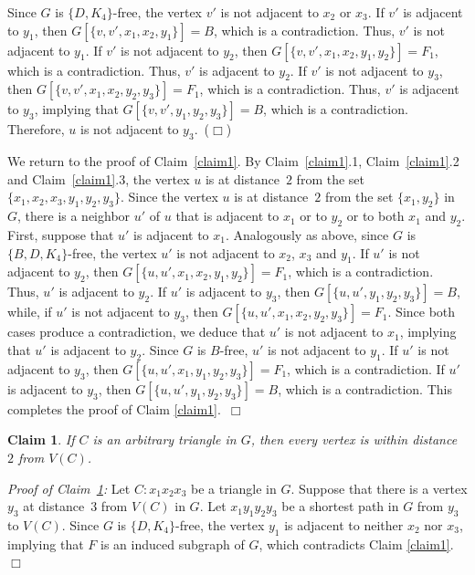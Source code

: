 \documentclass[12pt]{article}
\newtheorem{claim}{Claim}
\newcommand{\smallqed}{{\tiny ($\Box$)}}
\begin{document}
Since $G$ is $\{D,K_4\}$-free, the vertex $v'$ is not adjacent to $x_2$ or $x_3$.
If $v'$ is adjacent to $y_1$, then $G[\{v,v',x_1,x_2,y_1\}] = B$, which is a contradiction. Thus, $v'$ is not adjacent to $y_1$.
If $v'$ is not adjacent to $y_2$, then $G[\{v,v',x_1,x_2,y_1,y_2\}] = F_1$, which is a contradiction. Thus, $v'$ is adjacent to $y_2$.
If $v'$ is not adjacent to $y_3$, then $G[\{v, v', x_1, x_2, y_2,y_3\}]=F_1$, which is a contradiction. Thus, $v'$ is adjacent to $y_3$, implying that $G[\{v,v',y_1,y_2,y_3\}] = B$, which is a contradiction. Therefore, $u$ is not adjacent to $y_3$.~\smallqed

\medskip

\noindent We return to the proof of Claim~\ref{claim1}. By Claim~\ref{claim1}.1, Claim~\ref{claim1}.2 and Claim~\ref{claim1}.3, the vertex $u$ is at distance~$2$ from the set $\{x_1,x_2,x_3,y_1,y_2,y_3\}$. Since the vertex $u$ is at distance~$2$ from the set $\{x_1,y_2\}$ in $G$, there is a neighbor $u'$ of $u$ that is adjacent to $x_1$ or to $y_2$ or to both $x_1$ and $y_2$.
First, suppose that $u'$ is adjacent to $x_1$. 
Analogously as above, since $G$ is $\{B,D,K_4\}$-free, the vertex $u'$ is not adjacent to $x_2$, $x_3$ and $y_1$. 
If $u'$ is not adjacent to $y_2$, then $G[\{u,u',x_1,x_2,y_1, y_2\}]=F_1$, which is a contradiction. 
Thus, $u'$ is adjacent to $y_2$. If $u'$ is adjacent to $y_3$, then $G[\{u,u',y_1, y_2,y_3\}]=B$, while, if $u'$ is not adjacent to $y_3$, then $G[\{u,u',x_1,x_2,y_2,y_3\}]=F_1$. Since both cases produce a contradiction, we deduce that $u'$ is not adjacent to $x_1$, implying that $u'$ is adjacent to $y_2$. Since $G$ is $B$-free, $u'$ is not adjacent to $y_1$.
If $u'$ is not adjacent to $y_3$, then $G[\{u, u',x_1,y_1,y_2,y_3\}]=F_1$, which is a contradiction.
If $u'$ is adjacent to $y_3$, then $G[\{u, u', y_1,y_2,y_3\}]=B$, which is a contradiction.
This completes the proof of Claim \ref{claim1}.~$\Box$

\begin{claim}\label{claim2}
If $C$ is an arbitrary triangle in $G$, then every vertex is within distance $2$ from $V(C)$.
\end{claim}
{\it Proof of Claim~\ref{claim2}:}
Let $C \colon x_1x_2x_3$ be a triangle in $G$.
Suppose that there is a vertex $y_3$ at distance~$3$ from $V(C)$ in $G$. Let $x_1y_1y_2y_3$ be a shortest path in $G$ from $y_3$ to $V(C)$. Since $G$ is $\{D,K_4\}$-free, the vertex $y_1$ is adjacent to neither $x_2$ nor $x_3$, implying that $F$ is an induced subgraph of $G$, which contradicts Claim \ref{claim1}.~$\Box$
\end{document}
